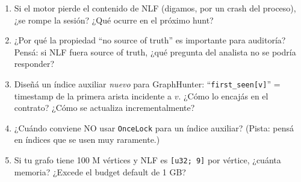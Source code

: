 \begin{ejercicios}
\begin{enumerate}
    \item \starred{} Si el motor pierde el contenido de NLF
    (digamos, por un crash del proceso), ¿se rompe la sesión? ¿Qué
    ocurre en el próximo hunt?

    \item ¿Por qué la propiedad ``no source of truth'' es
    importante para auditoría? Pensá: si NLF fuera source of truth,
    ¿qué pregunta del analista no se podría responder?

    \item \starred{} Diseñá un índice auxiliar \emph{nuevo} para
    GraphHunter: ``\texttt{first\_seen[v]}'' = timestamp de la
    primera arista incidente a \(v\). ¿Cómo lo encajás en el
    contrato? ¿Cómo se actualiza incrementalmente?

    \item ¿Cuándo conviene NO usar \texttt{OnceLock} para un
    índice auxiliar? (Pista: pensá en índices que se usen muy
    raramente.)

    \item Si tu grafo tiene 100 M vértices y NLF es
    \texttt{[u32; 9]} por vértice, ¿cuánta memoria? ¿Excede el
    budget default de 1 GB?
\end{enumerate}
\end{ejercicios}

